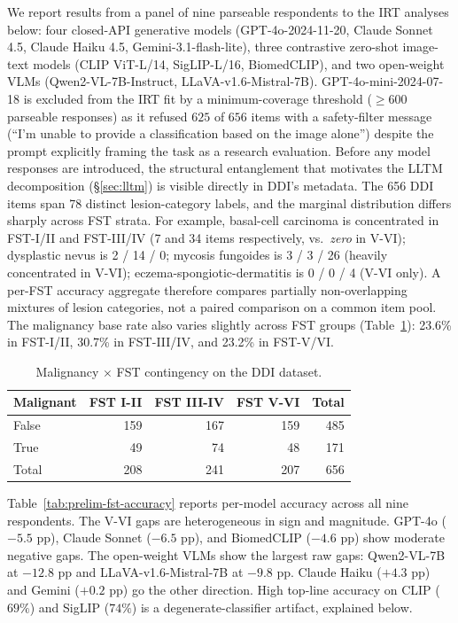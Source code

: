 \documentclass{article}
\begin{document}
We report results from a panel of nine parseable respondents to the IRT analyses below: four closed-API generative models (GPT-4o-2024-11-20, Claude Sonnet 4.5, Claude Haiku 4.5, Gemini-3.1-flash-lite), three contrastive zero-shot image-text models (CLIP ViT-L/14, SigLIP-L/16, BiomedCLIP), and two open-weight VLMs (Qwen2-VL-7B-Instruct, LLaVA-v1.6-Mistral-7B). GPT-4o-mini-2024-07-18 is excluded from the IRT fit by a minimum-coverage threshold ($\geq 600$ parseable responses) as it refused $625$ of $656$ items with a safety-filter message (``I'm unable to provide a classification based on the image alone'') despite the prompt explicitly framing the task as a research evaluation. 
\label{sec:prelim_entanglement}
Before any model responses are introduced, the structural entanglement that motivates the LLTM decomposition (\S\ref{sec:lltm}) is visible directly in DDI's metadata. The 656 DDI items span 78 distinct lesion-category labels, and the marginal distribution differs sharply across FST strata. For example, basal-cell carcinoma is concentrated in FST-I/II and FST-III/IV (7 and 34 items respectively, vs.\ \emph{zero} in V-VI); dysplastic nevus is 2 / 14 / 0; mycosis fungoides is 3 / 3 / 26 (heavily concentrated in V-VI); eczema-spongiotic-dermatitis is 0 / 0 / 4 (V-VI only). A per-FST accuracy aggregate therefore compares partially non-overlapping mixtures of lesion categories, not a paired comparison on a common item pool. The malignancy base rate also varies slightly across FST groups (Table~\ref{tab:contingency-malignant-fst}): 23.6\% in FST-I/II, 30.7\% in FST-III/IV, and 23.2\% in FST-V/VI. 

\begin{table}[t]
\centering
\caption{Malignancy $\times$ FST contingency on the DDI dataset. }
\label{tab:contingency-malignant-fst}
\begin{tabular}{lrrrr}
\toprule
Malignant & FST I-II & FST III-IV & FST V-VI & Total \\
\midrule
False & 159 & 167 & 159 & 485 \\
True  &  49 &  74 &  48 & 171 \\
\midrule
Total & 208 & 241 & 207 & 656 \\
\bottomrule
\end{tabular}
\end{table}

Table~\ref{tab:prelim-fst-accuracy} reports per-model accuracy across all nine respondents. The V-VI gaps are heterogeneous in sign and magnitude. GPT-4o ($-5.5$ pp), Claude Sonnet ($-6.5$ pp), and BiomedCLIP ($-4.6$ pp) show moderate negative gaps. The open-weight VLMs show the largest raw gaps: Qwen2-VL-7B at $-12.8$ pp and LLaVA-v1.6-Mistral-7B at $-9.8$ pp. Claude Haiku ($+4.3$ pp) and Gemini ($+0.2$ pp) go the other direction. High top-line accuracy on CLIP ($69\%$) and SigLIP ($74\%$) is a degenerate-classifier artifact, explained below.
\end{document}
